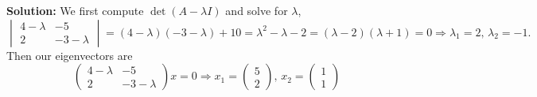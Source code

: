 \documentclass[reqno]{amsart}
\theoremstyle{definition}
\begin{document}
\begin{enumerate}
\textbf{Solution:  } We first compute $\det(A-\lambda I)$ and solve for $\lambda$,
%
\begin{equation*}
\begin{vmatrix}
4-\lambda & -5\\
2 & -3-\lambda
\end{vmatrix} = (4-\lambda)(-3-\lambda) + 10 = \lambda^2 - \lambda - 2 = (\lambda - 2)(\lambda + 1) = 0 \Rightarrow \lambda_1 = 2,\, \lambda_2 = -1.
\end{equation*}
%
Then our eigenvectors are
%
\begin{equation*}
\begin{pmatrix}
4-\lambda & -5\\
2 & -3-\lambda
\end{pmatrix}x = 0 \Rightarrow x_1 = \begin{pmatrix}
5\\
2
\end{pmatrix},\, x_2 = \begin{pmatrix}
1\\
1
\end{pmatrix}
\end{equation*}

\end{enumerate}
\end{document}
